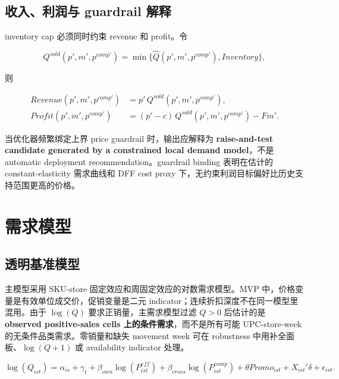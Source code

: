\documentclass[UTF8,11pt,a4paper,fontset=none]{ctexart}
\begin{document}
\subsection{收入、利润与 guardrail 解释}

inventory cap 必须同时约束 revenue 和 profit。令

\begin{equation}
Q^{sold}(p',m',p^{comp\prime})=
\min\{\widehat{Q}(p',m',p^{comp\prime}),Inventory\},
\end{equation}

则

\begin{align}
Revenue(p',m',p^{comp\prime}) &= p'\,Q^{sold}(p',m',p^{comp\prime}),\\
Profit(p',m',p^{comp\prime}) &= (p'-c)\,Q^{sold}(p',m',p^{comp\prime})-F m'.
\end{align}

当优化器频繁绑定上界 price guardrail 时，输出应解释为 \textbf{raise-and-test candidate generated by a constrained local demand model}，不是 automatic deployment recommendation。guardrail binding 表明在估计的 constant-elasticity 需求曲线和 DFF cost proxy 下，无约束利润目标偏好比历史支持范围更高的价格。

\section{需求模型}

\subsection{透明基准模型}

主模型采用 SKU-store 固定效应和周固定效应的对数需求模型。MVP 中，价格变量是有效单位成交价，促销变量是二元 indicator；连续折扣深度不在同一模型里混用。由于 $\log(Q)$ 要求正销量，主需求模型过滤 $Q>0$ 后估计的是 \textbf{observed positive-sales cells 上的条件需求}，而不是所有可能 UPC-store-week 的无条件品类需求。零销量和缺失 movement week 可在 robustness 中用补全面板、$\log(Q+1)$ 或 availability indicator 处理。

\begin{equation}
\log(Q_{ist})=\alpha_{is} + \gamma_t + \beta_{own}\log(P^{eff}_{ist}) + \beta_{cross}\log(P^{comp}_{ist}) + \theta Promo_{ist} + X_{ist}'\delta + \epsilon_{ist}.
\end{equation}
\end{document}
